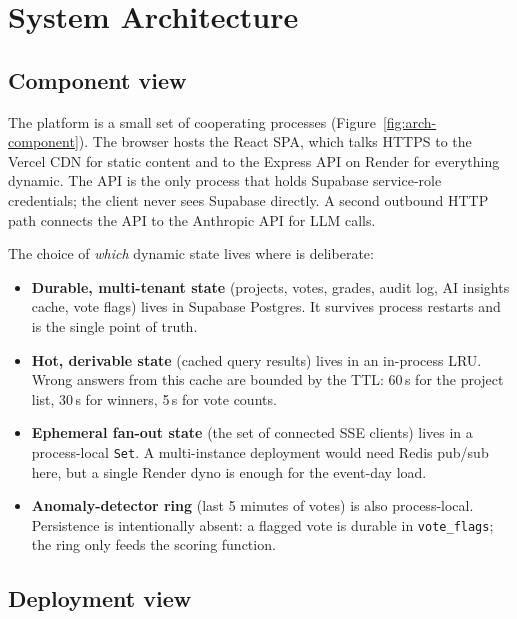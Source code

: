 \section{System Architecture}
\label{sec:architecture}

\subsection{Component view}

The platform is a small set of cooperating processes (Figure~\ref{fig:arch-component}).
The browser hosts the React SPA, which talks HTTPS to the Vercel CDN for
static content and to the Express API on Render for everything dynamic. The
API is the only process that holds Supabase service-role credentials; the
client never sees Supabase directly. A second outbound HTTP path connects
the API to the Anthropic API for LLM calls.


The choice of \emph{which} dynamic state lives where is deliberate:

\begin{itemize}[leftmargin=*]
  \item \textbf{Durable, multi-tenant state} (projects, votes, grades,
        audit log, AI insights cache, vote flags) lives in Supabase
        Postgres. It survives process restarts and is the single point of
        truth.
  \item \textbf{Hot, derivable state} (cached query results) lives in an
        in-process LRU. Wrong answers from this cache are bounded by the
        TTL: 60\,s for the project list, 30\,s for winners, 5\,s for vote
        counts.
  \item \textbf{Ephemeral fan-out state} (the set of connected SSE clients)
        lives in a process-local \texttt{Set}. A multi-instance deployment
        would need Redis pub/sub here, but a single Render dyno is enough
        for the event-day load.
  \item \textbf{Anomaly-detector ring} (last 5 minutes of votes) is also
        process-local. Persistence is intentionally absent: a flagged vote
        is durable in \texttt{vote\_flags}; the ring only feeds the scoring
        function.
\end{itemize}

\subsection{Deployment view}

